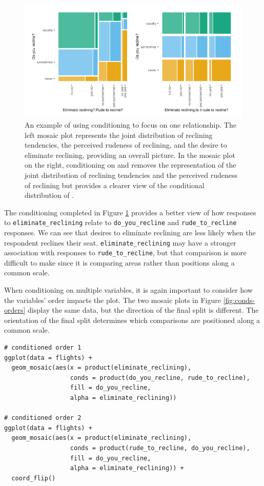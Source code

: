 \begin{figure}

{\centering \includegraphics[width=1\linewidth]{jeppson-hofmann_files/figure-latex/conds3-1} 

}

\caption{An example of using conditioning to focus on one relationship. The left mosaic plot represents the joint distribution of reclining tendencies, the perceived rudeness of reclining, and the desire to eliminate reclining, providing an overall picture. In the mosaic plot on the right, conditioning on  and  removes the representation of the joint distribution of reclining tendencies and the perceived rudeness of reclining but provides a clearer view of the conditional distribution of .}\label{fig:conds3}
\end{figure}

The conditioning completed in Figure \ref{fig:conds3} provides a better view of how responses to \texttt{eliminate\_reclining} relate to \texttt{do\_you\_recline} and \texttt{rude\_to\_recline} responses. We can see that desires to eliminate reclining are less likely when the respondent reclines their seat. \texttt{eliminate\_reclining} may have a stronger association with responses to \texttt{rude\_to\_recline}, but that comparison is more difficult to make since it is comparing areas rather than positions along a common scale.

When conditioning on multiple variables, it is again important to consider how the variables' order impacts the plot. The two mosaic plots in Figure \ref{fig:conds-orders} display the same data, but the direction of the final split is different. The orientation of the final split determines which comparisons are positioned along a common scale.

\begin{verbatim}
# conditioned order 1
ggplot(data = flights) +
  geom_mosaic(aes(x = product(eliminate_reclining), 
                  conds = product(do_you_recline, rude_to_recline), 
                  fill = do_you_recline, 
                  alpha = eliminate_reclining))

# conditioned order 2
ggplot(data = flights) +
  geom_mosaic(aes(x = product(eliminate_reclining), 
                  conds = product(rude_to_recline, do_you_recline), 
                  fill = do_you_recline, 
                  alpha = eliminate_reclining)) + 
  coord_flip()
\end{verbatim}

